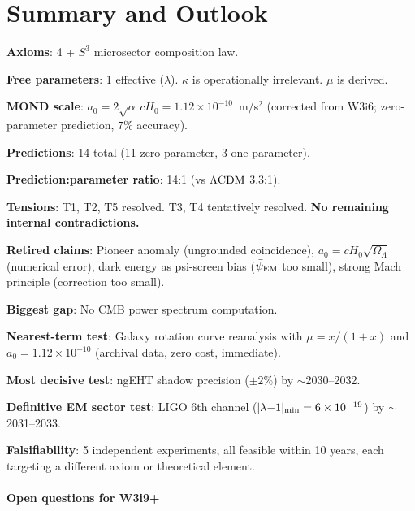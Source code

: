 \documentclass[11pt]{article}
\newcommand{\ee}[1]{\times 10^{#1}}
\newcommand{\psiEM}{\bar{\psi}_{\rm EM}}
\newcommand{\aM}{a_0}
\newcommand{\LCDM}{\Lambda{\rm CDM}}
\newcommand{\Hzero}{H_0}
\newcommand{\lamdiff}{|\lambda{-}1|}
\newcommand{\mufd}{\mu}
\newcommand{\OmL}{\Omega_\Lambda}
\begin{document}
\part{Summary and Outlook}
\label{part:summary}

\begin{tcolorbox}[colback=green!5!white, colframe=green!60!black,
  title=\textbf{W3i8 Canonical Two-Component DFD: Final Summary Card}]

\textbf{Axioms}: 4 + $S^3$ microsector composition law.

\textbf{Free parameters}: 1 effective ($\lambda$). $\kappa$ is
operationally irrelevant. $\mufd$ is derived.

\textbf{MOND scale}: $\aM = 2\sqrt{\alpha}\,c\Hzero = 1.12\ee{-10}$~m/s$^2$
(corrected from W3i6; zero-parameter prediction, $7\%$ accuracy).

\textbf{Predictions}: 14 total (11 zero-parameter, 3 one-parameter).

\textbf{Prediction:parameter ratio}: 14:1 (vs $\LCDM$ 3.3:1).

\textbf{Tensions}: T1, T2, T5 resolved. T3, T4 tentatively resolved.
\textbf{No remaining internal contradictions.}

\textbf{Retired claims}: Pioneer anomaly (ungrounded coincidence),
$\aM = c\Hzero\sqrt{\OmL}$ (numerical error), dark energy as
psi-screen bias ($\psiEM$ too small), strong Mach principle
(correction too small).

\textbf{Biggest gap}: No CMB power spectrum computation.

\textbf{Nearest-term test}: Galaxy rotation curve reanalysis with
$\mufd = x/(1+x)$ and $\aM = 1.12\ee{-10}$ (archival data, zero
cost, immediate).

\textbf{Most decisive test}: ngEHT shadow precision ($\pm 2\%$) by
$\sim$2030--2032.

\textbf{Definitive EM sector test}: LIGO 6th channel
($\lamdiff_{\rm min} = 6\ee{-19}$) by $\sim$2031--2033.

\textbf{Falsifiability}: 5 independent experiments, all feasible
within 10 years, each targeting a different axiom or theoretical
element.
\end{tcolorbox}

\subsection*{Open questions for W3i9+}
\end{document}
